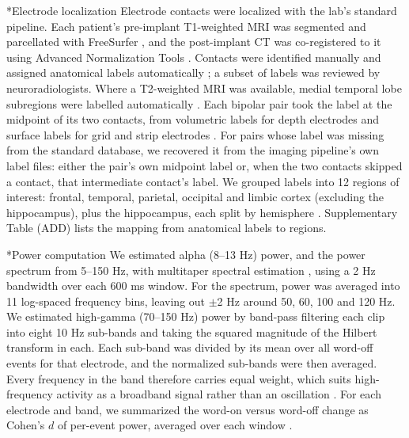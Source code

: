 \documentclass[10pt,twocolumn]{article}  %
\makeatletter
\renewcommand\subsection{\@startsection{subsection}{2}{\z@}{-8pt plus -2pt minus -1pt}{2pt}{\raggedright\sffamily\bfseries\normalsize}}
\makeatother
\begin{document}
\subsection*{Electrode localization}\label{electrode-localization}
Electrode contacts were localized with the lab's standard pipeline. Each patient's pre-implant T1-weighted MRI was segmented and parcellated with FreeSurfer \citep{Fischl_2002,Fischl_2004,Desikan_2006}, and the post-implant CT was co-registered to it using Advanced Normalization Tools \citep{Avants_2008}. Contacts were identified manually and assigned anatomical labels automatically \citep{Dykstra_2012}; a subset of labels was reviewed by neuroradiologists. Where a T2-weighted MRI was available, medial temporal lobe subregions were labelled automatically \citep{Yushkevich_2014}. Each bipolar pair took the label at the midpoint of its two contacts, from volumetric labels for depth electrodes and surface labels for grid and strip electrodes \citep{Azarion_2014}. For pairs whose label was missing from the standard database, we recovered it from the imaging pipeline's own label files: either the pair's own midpoint label or, when the two contacts skipped a contact, that intermediate contact's label. We grouped labels into 12 regions of interest: frontal, temporal, parietal, occipital and limbic cortex (excluding the hippocampus), plus the hippocampus, each split by hemisphere \citep{Burke_2013}. Supplementary Table (ADD) lists the mapping from anatomical labels to regions.

\subsection*{Power computation}\label{power}
We estimated alpha (8--13 Hz) power, and the power spectrum from 5--150 Hz, with multitaper spectral estimation \citep{Thomson_1982,Slepian_1978,Percival_1993,Prerau_2017}, using a 2 Hz bandwidth over each 600 ms window. For the spectrum, power was averaged into 11 log-spaced frequency bins, leaving out $\pm$2 Hz around 50, 60, 100 and 120 Hz. We estimated high-gamma (70--150 Hz) power by band-pass filtering each clip into eight 10 Hz sub-bands and taking the squared magnitude of the Hilbert transform in each. Each sub-band was divided by its mean over all word-off events for that electrode, and the normalized sub-bands were then averaged. Every frequency in the band therefore carries equal weight, which suits high-frequency activity as a broadband signal rather than an oscillation \citep{Burke_2015a,Edwards_2009,Bruns_2004,Manning_2009,Ray_2011}. For each electrode and band, we summarized the word-on versus word-off change as Cohen's $d$ of per-event power, averaged over each window \citep{Cohen_2013,Lakens_2013}.
\end{document}
